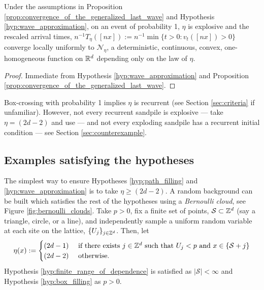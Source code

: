 \documentclass[12pt]{amsart}
\begin{document}
\begin{theorem}
	Under the assumptions in Proposition \ref{prop:convergence_of_the_generalized_last_wave} and Hypothesis \ref{hyp:wave_approximation},
	on an event of probability 1, $\eta$ is explosive and the rescaled arrival times, $n^{-1} T_{\eta}([nx]) := n^{-1} \min \{ t > 0 : v_t([nx]) > 0\}$ converge locally uniformly to $\mathcal{N}_{\eta}$, a deterministic, continuous, convex, one-homogeneous function on $\mathbb{R}^d$
	depending only on the law of $\eta$.
\end{theorem}

\begin{proof}
	Immediate from Hypothesis \ref{hyp:wave_approximation} and Proposition \ref{prop:convergence_of_the_generalized_last_wave}.
\end{proof}

\begin{remark} 
	Box-crossing with probability 1 implies $\eta$ is recurrent (see Section \ref{sec:criteria} if unfamiliar).  However, not every 
	recurrent sandpile is explosive  --- take $\eta = (2 d - 2)$ and use \cite{fey2010growth} --- and not every exploding sandpile has a recurrent initial condition ---  see Section \ref{sec:counterexample}. 
\end{remark}



\subsection{Examples satisfying the hypotheses}

The simplest way to ensure Hypotheses \ref{hyp:path_filling} and \ref{hyp:wave_approximation}
is to take $\eta \geq (2 d - 2)$. A random background can be built which satisfies the 
rest of the hypotheses using a {\it Bernoulli cloud}, see Figure \ref{fig:bernoulli_clouds}. Take $p > 0$, fix a finite set of points, $\mathcal{S} \subset \mathbb{Z}^d$ (say a triangle, circle, or a line), and independently sample a uniform random variable at each site on the lattice, $\{U_j\}_{j \in \mathbb{Z}^d}$. 
Then, let 
\begin{equation} \label{eq:bernoulli_cloud}
\eta(x)  :=  
\begin{cases} (2 d- 1)  & \mbox{ if there exists $j \in \mathbb{Z}^d$ such that $U_j < p$ and $x \in \{ \mathcal{S} + j \}$} \\
(2d - 2) & \mbox{ otherwise.}
\end{cases}
\end{equation}
Hypothesis \ref{hyp:finite_range_of_dependence} is satisfied as $|\mathcal{S}| < \infty$
and Hypothesis \ref{hyp:box_filling} as $p > 0$. 
\end{document}
